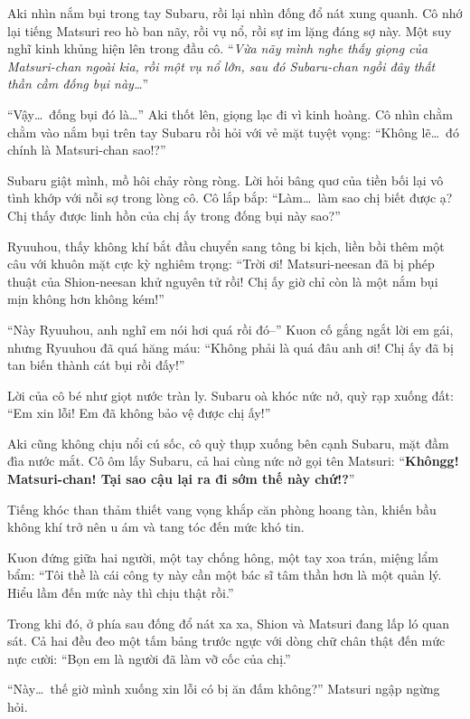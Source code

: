 \documentclass[../main.tex]{subfiles}
\begin{document}
Aki nhìn nắm bụi trong tay Subaru, rồi lại nhìn đống đổ nát xung quanh. Cô nhớ lại tiếng Matsuri reo hò ban nãy, rồi vụ nổ, rồi sự im lặng đáng sợ này. Một suy nghĩ kinh khủng hiện lên trong đầu cô. ``\textit{Vừa nãy mình nghe thấy giọng của Matsuri-chan ngoài kia, rồi một vụ nổ lớn, sau đó Subaru-chan ngồi đây thất thần cầm đống bụi này\dots}''

``Vậy\dots\ đống bụi đó là\dots'' Aki thốt lên, giọng lạc đi vì kinh hoàng. Cô nhìn chằm chằm vào nắm bụi trên tay Subaru rồi hỏi với vẻ mặt tuyệt vọng: ``Không lẽ\dots\ đó chính là Matsuri-chan sao!?''

Subaru giật mình, mồ hôi chảy ròng ròng. Lời hỏi bâng quơ của tiền bối lại vô tình khớp với nỗi sợ trong lòng cô. Cô lắp bắp: ``Làm\dots\ làm sao chị biết được ạ? Chị thấy được linh hồn của chị ấy trong đống bụi này sao?''

Ryuuhou, thấy không khí bắt đầu chuyển sang tông bi kịch, liền bồi thêm một câu với khuôn mặt cực kỳ nghiêm trọng: ``Trời ơi! Matsuri-neesan đã bị phép thuật của Shion-neesan khử nguyên tử rồi! Chị ấy giờ chỉ còn là một nắm bụi mịn không hơn không kém!''

``Này Ryuuhou, anh nghĩ em nói hơi quá rồi đó--'' Kuon cố gắng ngắt lời em gái, nhưng Ryuuhou đã quá hăng máu: ``Không phải là quá đâu anh ơi! Chị ấy đã bị tan biến thành cát bụi rồi đấy!''

Lời của cô bé như giọt nước tràn ly. Subaru oà khóc nức nở, quỳ rạp xuống đất: ``Em xin lỗi! Em đã không bảo vệ được chị ấy!''

Aki cũng không chịu nổi cú sốc, cô quỳ thụp xuống bên cạnh Subaru, mặt đầm đìa nước mắt. Cô ôm lấy Subaru, cả hai cùng nức nở gọi tên Matsuri: ``\textbf{Khôngg! Matsuri-chan! Tại sao cậu lại ra đi sớm thế này chứ!?}''


Tiếng khóc than thảm thiết vang vọng khắp căn phòng hoang tàn, khiến bầu không khí trở nên u ám và tang tóc đến mức khó tin.

Kuon đứng giữa hai người, một tay chống hông, một tay xoa trán, miệng lẩm bẩm: ``Tôi thề là cái công ty này cần một bác sĩ tâm thần hơn là một quản lý. Hiểu lầm đến mức này thì chịu thật rồi.''

Trong khi đó, ở phía sau đống đổ nát xa xa, Shion và Matsuri đang lấp ló quan sát. Cả hai đều đeo một tấm bảng trước ngực với dòng chữ chân thật đến mức nực cười: ``Bọn em là người đã làm vỡ cốc của chị.''

``Này\dots\ thế giờ mình xuống xin lỗi có bị ăn đấm không?'' Matsuri ngập ngừng hỏi.
\end{document}
